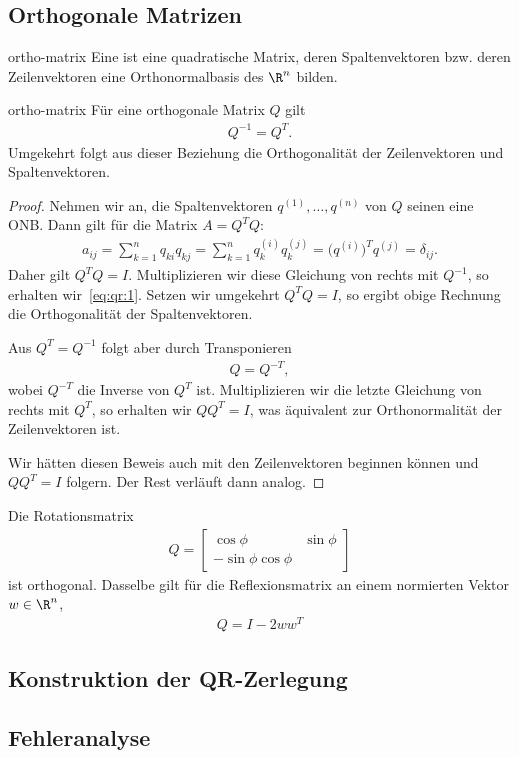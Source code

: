 \subsection{Orthogonale Matrizen}

\begin{Definition}{ortho-matrix}
  Eine  ist eine quadratische Matrix, deren
  Spaltenvektoren bzw. deren Zeilenvektoren eine Orthonormalbasis des
  $\R^n$ bilden.
\end{Definition}

\begin{Satz}{ortho-matrix}
  Für eine orthogonale Matrix $Q$ gilt
  \begin{gather}
    \label{eq:qr:1}
    Q^{-1} = Q^T.
  \end{gather}
  Umgekehrt folgt aus dieser Beziehung die Orthogonalität der
  Zeilenvektoren und Spaltenvektoren.
\end{Satz}

\begin{proof}
  Nehmen wir an, die Spaltenvektoren $q^{(1)},\dots,q^{(n)}$ von $Q$
  seinen eine ONB. Dann gilt für die Matrix $A = Q^TQ$:
  \begin{gather}
    a_{ij} = \sum_{k=1}^n q_{ki}q_{kj}
    = \sum_{k=1}^n q^{(i)}_k q^{(j)}_k
    = \bigl(q^{(i)}\bigr)^T q^{(j)} = \delta_{ij}.
  \end{gather}
  Daher gilt $Q^TQ=I$.  Multiplizieren wir diese Gleichung von rechts
  mit $Q^{-1}$, so erhalten wir~\eqref{eq:qr:1}. Setzen wir umgekehrt
  $Q^TQ=I$, so ergibt obige Rechnung die Orthogonalität der
  Spaltenvektoren.

  Aus $Q^T = Q^{-1}$ folgt aber durch Transponieren
  \begin{gather}
    Q = Q^{-T},
  \end{gather}
  wobei $Q^{-T}$ die Inverse von $Q^T$ ist. Multiplizieren wir die
  letzte Gleichung von rechts mit $Q^T$, so erhalten wir $QQ^T = I$,
  was äquivalent zur Orthonormalität der Zeilenvektoren ist.

  Wir hätten diesen Beweis auch mit den Zeilenvektoren beginnen können
  und $QQ^T=I$ folgern. Der Rest verläuft dann analog.
\end{proof}

\begin{example}
  Die Rotationsmatrix
  \begin{gather}
    Q = \begin{bmatrix}
      \cos \phi & \sin \phi\\-\sin\phi\cos\phi
    \end{bmatrix}
  \end{gather}
  ist orthogonal. Dasselbe gilt für die Reflexionsmatrix an einem
  normierten Vektor $w\in \R^n$,
  \begin{gather}
    Q = I-2ww^T
  \end{gather}
\end{example}

\subsection{Konstruktion der QR-Zerlegung}

\subsection{Fehleranalyse}


